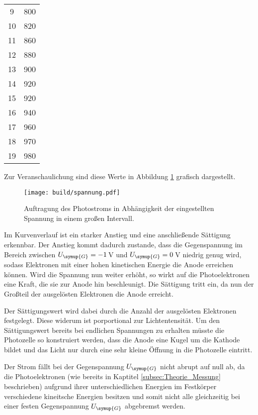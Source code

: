 \begin{table}[htp]
\begin{center}
\begin{tabular}{SS}
                          9 & 800\\
                         10 & 820\\
                         11 & 860\\
                         12 & 880\\
                         13 & 900\\
                         14 & 920\\
                         15 & 920\\
                         16 & 940\\
                         17 & 960\\
                         18 & 970\\
                         19 & 980\\
                \bottomrule
                \end{tabular}
        \end{center}
\end{table}

Zur Veranschaulichung sind diese Werte in Abbildung \ref{fig:letztes} grafisch dargestellt.

\begin{figure}
  \centering
  \texttt{[image: build/spannung.pdf]}
  \caption{Auftragung des Photostroms in Abhängigkeit der eingestellten Spannung in einem großen Intervall.}
  \label{fig:letztes}
\end{figure}

Im Kurvenverlauf ist ein starker Anstieg und eine anschließende
Sättigung erkennbar. Der Anstieg kommt dadurch zustande, dass die Gegenspannung
im Bereich zwischen $U_{\symup{G}}=-1\,$V und $U_{\symup{G}}=0\,$V niedrig genug
wird, sodass Elektronen mit einer hohen kinetischen Energie die Anode erreichen
können. Wird die Spannung nun weiter erhöht, so wirkt auf die Photoelektronen
eine Kraft, die sie zur Anode hin beschleunigt. Die Sättigung tritt ein, da
nun der Großteil der ausgelösten Elektronen die Anode erreicht.

Der Sättigungswert wird dabei durch die Anzahl der ausgelösten Elektronen
festgelegt. Diese widerum ist porportional zur Lichtentensität.
Um den Sättigungswert bereits bei endlichen Spannungen zu erhalten müsste die
Photozelle so konstruiert werden, dass die Anode eine Kugel um die Kathode bildet
und das Licht nur durch eine sehr kleine Öffnung in die Photozelle eintritt.

Der Strom fällt bei der Gegenspannung $U_{\symup{G}}$ nicht abrupt auf null ab,
da die Photoelektronen (wie bereits in Kaptitel \ref{subsec:Theorie_Messung}
beschrieben) aufgrund ihrer unterschiedlichen Energien im Festkörper
verschiedene kineitsche Energien besitzen und somit nicht alle gleichzeitig
bei einer festen Gegenspannung $U_{\symup{G}}$ abgebremst werden.

